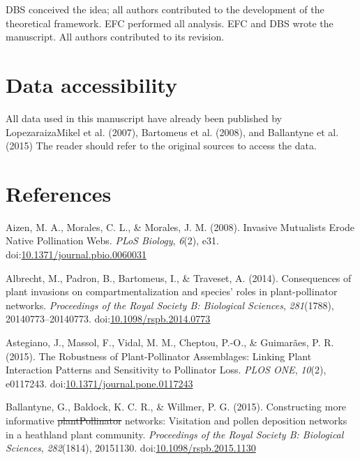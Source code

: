\documentclass[a4paper]{artikel1}
\theoremstyle{definition}
\theoremstyle{definition}
\theoremstyle{definition}
\theoremstyle{remark}
\providecommand{\DIFaddtex}[1]{{\protect\color{blue}\uwave{#1}}} %
\providecommand{\DIFdeltex}[1]{{\protect\color{red}\sout{#1}}}                      %
\providecommand{\DIFaddbegin}{} %
\providecommand{\DIFaddend}{} %
\providecommand{\DIFdelbegin}{} %
\providecommand{\DIFdelend}{} %
\providecommand{\DIFadd}[1]{\texorpdfstring{\DIFaddtex{#1}}{#1}} %
\providecommand{\DIFdel}[1]{\texorpdfstring{\DIFdeltex{#1}}{}} %
\begin{document}
DBS conceived the idea; all authors contributed to the development of
the theoretical framework. EFC performed all analysis. EFC and DBS wrote
the manuscript. All authors contributed to its revision.

\section{Data accessibility}\label{data-accessibility}

All data used in this manuscript have already been published by
Lopezaraiza\textendash{}Mikel et al. (2007), Bartomeus et al. (2008),
and Ballantyne et al. (2015) The reader should refer to the original
sources to access the data.

\section*{References}\label{references}

\hypertarget{refs}{}
\hypertarget{ref-aizen_invasive_2008}{}
Aizen, M. A., Morales, C. L., \& Morales, J. M. (2008). Invasive
Mutualists Erode Native Pollination Webs. \emph{PLoS Biology},
\emph{6}(2), e31.
doi:\href{https://doi.org/10.1371/journal.pbio.0060031}{10.1371/journal.pbio.0060031}

\hypertarget{ref-albrecht_consequences_2014}{}
Albrecht, M., Padron, B., Bartomeus, I., \& Traveset, A. (2014).
Consequences of plant invasions on compartmentalization and species'
roles in plant-pollinator networks. \emph{Proceedings of the Royal
Society B: Biological Sciences}, \emph{281}(1788), 20140773--20140773.
doi:\href{https://doi.org/10.1098/rspb.2014.0773}{10.1098/rspb.2014.0773}

\hypertarget{ref-astegiano_robustness_2015}{}
Astegiano, J., Massol, F., Vidal, M. M., Cheptou, P.-O., \& Guimarães,
P. R. (2015). The Robustness of Plant-Pollinator Assemblages: Linking
Plant Interaction Patterns and Sensitivity to Pollinator Loss.
\emph{PLOS ONE}, \emph{10}(2), e0117243.
doi:\href{https://doi.org/10.1371/journal.pone.0117243}{10.1371/journal.pone.0117243}

\hypertarget{ref-ballantyne_constructing_2015}{}
Ballantyne, G., Baldock, K. C. R., \& Willmer, P. G. (2015).
Constructing more informative \DIFdelbegin \DIFdel{plantPollinator }\DIFdelend \DIFaddbegin \DIFadd{plant-pollinator }\DIFaddend networks: Visitation and
pollen deposition networks in a heathland plant community.
\emph{Proceedings of the Royal Society B: Biological Sciences},
\emph{282}(1814), 20151130.
doi:\href{https://doi.org/10.1098/rspb.2015.1130}{10.1098/rspb.2015.1130}
\end{document}
